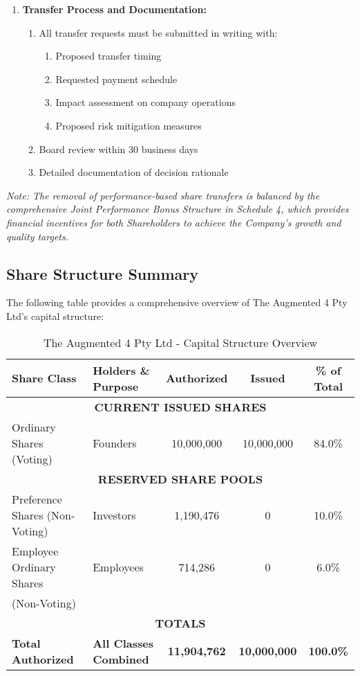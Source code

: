 \begin{enumerate}[label=(\alph*)]
\item \textbf{Transfer Process and Documentation:}
    \begin{enumerate}[label=(\roman*)]
    \item All transfer requests must be submitted in writing with:
        \begin{enumerate}[label=(\alph*)]
        \item Proposed transfer timing
        \item Requested payment schedule
        \item Impact assessment on company operations
        \item Proposed risk mitigation measures
        \end{enumerate}
    \item Board review within 30 business days
    \item Detailed documentation of decision rationale
    \end{enumerate}
\end{enumerate}

\textit{Note: The removal of performance-based share transfers is balanced by the comprehensive Joint Performance Bonus Structure in Schedule 4, which provides financial incentives for both Shareholders to achieve the Company's growth and quality targets.} 

\subsection{Share Structure Summary}

The following table provides a comprehensive overview of The Augmented 4 Pty Ltd's capital structure:

\begin{table}[H]
\centering
\begin{tabularx}{\textwidth}{|l|X|c|c|c|}
\hline
\textbf{Share Class} & \textbf{Holders \& Purpose} & \textbf{Authorized} & \textbf{Issued} & \textbf{\% of Total} \\
\hline
\multicolumn{5}{|c|}{\textbf{CURRENT ISSUED SHARES}} \\
\hline
Ordinary Shares (Voting) & Founders & 10,000,000 & 10,000,000 & 84.0\% \\
\hline
\multicolumn{5}{|c|}{\textbf{RESERVED SHARE POOLS}} \\
\hline
Preference Shares (Non-Voting) & Investors & 1,190,476 & 0 & 10.0\% \\
\hline
Employee Ordinary Shares & Employees & 714,286 & 0 & 6.0\% \\
(Non-Voting) & & & & \\
\hline
\multicolumn{5}{|c|}{\textbf{TOTALS}} \\
\hline
\textbf{Total Authorized} & \textbf{All Classes Combined} & \textbf{11,904,762} & \textbf{10,000,000} & \textbf{100.0\%} \\
\hline
\end{tabularx}
\caption{The Augmented 4 Pty Ltd - Capital Structure Overview}
\end{table}

